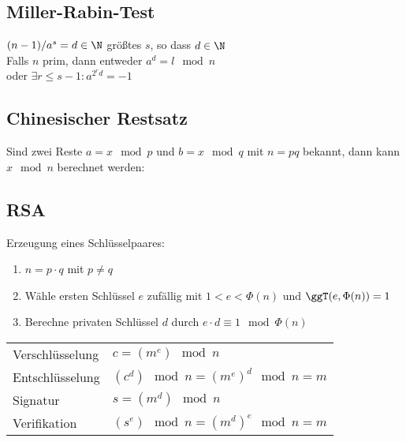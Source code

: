 \documentclass[fs]{latex4ei}
\begin{document}
\begin{multicols}{4}
	
	\subsection{Miller-Rabin-Test}
	$(n-1) / a^s = d \in \N$ \quad größtes $s$, so dass $d \in \N$\\
	Falls $n$ prim, dann entweder $a^d = l \mod n$ \\
	oder $\exists r \le s-1: a^{2^r d} = -1$\\
	
	\subsection{Chinesischer Restsatz}
	Sind zwei Reste $a = x \mod p$ und $b = x \mod q$ mit $n = pq$ bekannt, dann kann
	$x \mod n$ berechnet werden:
	
	
	
	\subsection{RSA}
	Erzeugung eines Schlüsselpaares: 
	\begin{enumerate}
		\item $n = p \cdot q$ mit $p \ne q$
		\item Wähle ersten Schlüssel $e$ zufällig mit $1 < e < \Phi(n)$ und $\ggT(e,\Phi(n)) = 1$
		\item Berechne privaten Schlüssel $d$ durch $e \cdot d \equiv 1 \mod \Phi(n)$
	\end{enumerate}	
	
	\begin{tabular}{ll}
	Verschlüsselung & $c = (m^e) \mod n$\\
	Entschlüsselung & $(c^d) \mod n = (m^e)^d \mod n = m$\\
	Signatur & $s = (m^d) \mod n$\\
	Verifikation & $(s^e) \mod n = (m^d)^e \mod n = m$\\
	\end{tabular}
		

\end{multicols}
\end{document}
